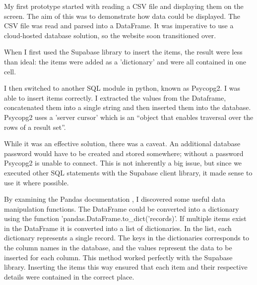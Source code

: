 My first prototype started with reading a CSV file and displaying them on the screen.
The aim of this was to demonstrate how data could be displayed.
The CSV file was read and parsed into a DataFrame.
It was imperative to use a cloud-hosted database solution, so the website soon transitioned over.

When I first used the Supabase library to insert the items, the result were less than ideal: the items were added as a 'dictionary' and were all contained in one cell.

I then switched to another SQL module in python, known as Psycopg2.
I was able to insert items correctly.
I extracted the values from the Dataframe, concatenated them into a single string and then inserted them into the database.
Psycopg2 uses a 'server cursor' which is an “object that enables traversal over the rows of a result set”.

While it was an effective solution, there was a caveat.
An additional database password would have to be created and stored somewhere; without a password Psycopg2 is unable to connect.
This is not inherently a big issue, but since we executed other SQL statements with the Supabase client library, it made sense to use it where possible.

By examining the Pandas documentation \cite{pd}, I discovered some useful data manipulation functions.
The DataFrame could be converted into a dictionary using the function 'pandas.DataFrame.to\_dict('records)'.
If multiple items exist in the DataFrame it is converted into a list of dictionaries.
 In the list, each dictionary represents a single record.
The keys in the dictionaries corresponds to the column names in the database, and the values represent the data to be inserted for each column.
This method worked perfectly with the Supabase library.
Inserting the items this way ensured that each item and their respective details were contained in the correct place.